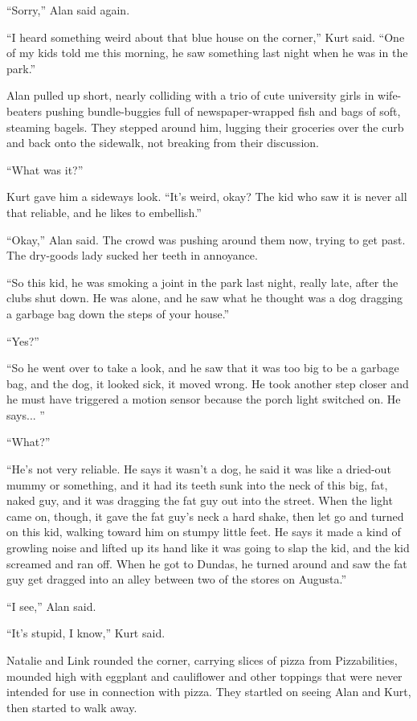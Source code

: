 ``Sorry,'' Alan said again.

``I heard something weird about that blue house on the corner,'' Kurt
said.  ``One of my kids told me this morning, he saw something last
night when he was in the park.''

Alan pulled up short, nearly colliding with a trio of cute university
girls in wife-beaters pushing bundle-buggies full of newspaper-wrapped
fish and bags of soft, steaming bagels.  They stepped around him,
lugging their groceries over the curb and back onto the sidewalk, not
breaking from their discussion.

``What was it?''

Kurt gave him a sideways look.  ``It's weird, okay?  The kid who saw
it is never all that reliable, and he likes to embellish.''

``Okay,'' Alan said.  The crowd was pushing around them now, trying to
get past.  The dry-goods lady sucked her teeth in annoyance.

``So this kid, he was smoking a joint in the park last night, really
late, after the clubs shut down.  He was alone, and he saw what he
thought was a dog dragging a garbage bag down the steps of your
house.''

``Yes?''

``So he went over to take a look, and he saw that it was too big to be
a garbage bag, and the dog, it looked sick, it moved wrong.  He took
another step closer and he must have triggered a motion sensor because
the porch light switched on.  He says...  ''

``What?''

``He's not very reliable.  He says it wasn't a dog, he said it was
like a dried-out mummy or something, and it had its teeth sunk into
the neck of this big, fat, naked guy, and it was dragging the fat guy
out into the street.  When the light came on, though, it gave the fat
guy's neck a hard shake, then let go and turned on this kid, walking
toward him on stumpy little feet.  He says it made a kind of growling
noise and lifted up its hand like it was going to slap the kid, and
the kid screamed and ran off.  When he got to Dundas, he turned around
and saw the fat guy get dragged into an alley between two of the
stores on Augusta.''

``I see,'' Alan said.

``It's stupid, I know,'' Kurt said.

Natalie and Link rounded the corner, carrying slices of pizza from
Pizzabilities, mounded high with eggplant and cauliflower and other
toppings that were never intended for use in connection with pizza. 
They startled on seeing Alan and Kurt, then started to walk away.

